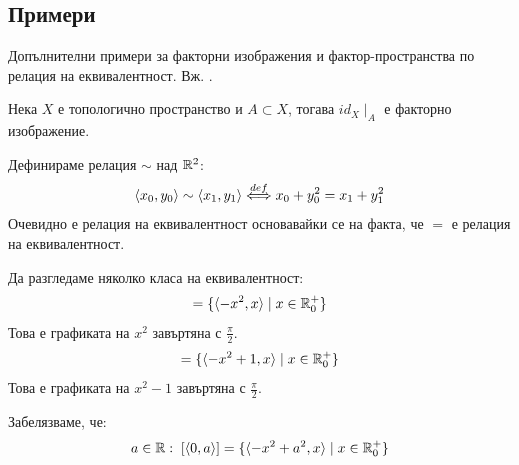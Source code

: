 \subsection{Примери}
Допълнителни примери за факторни изображения и фактор-пространства по релация на еквивалентност. Вж. \cite[стр.~144-145]{munkrestopology}.
\begin{example}
    Нека $X$ е топологично пространство и $A \subset X$, тогава $id_X\mid_A$ е факторно изображение.
\end{example}
\begin{example}
    Дефинираме релация $\sim$ над ${\mathbb{R}}^2$:
    \begin{equation}
        \langle x_0, y_0 \rangle \sim \langle x_1, y_1 \rangle {\overset{def}{\iff}} x_0 + y_0^2 = x_1 + y_1 ^2
    \end{equation}
    Очевидно е релация на еквивалентност основавайки се на факта, че $=$ е релация на еквивалентност.

    Да разгледаме няколко класа на еквивалентност:
    \begin{equation}
        [\langle 0, 0 \rangle] = \{ \langle -x^2, x \rangle \mid x \in \R_0^+\}
    \end{equation}
    Това е графиката на $x^2$ завъртяна с $\frac{\pi}{2}$.
    \begin{equation}
        [\langle 0, 1 \rangle] = \{ \langle -x^2 + 1, x \rangle \mid x \in \R_0^+\}
    \end{equation}
    Това е графиката на $x^2 - 1$ завъртяна с $\frac{\pi}{2}$.

    Забелязваме, че:
    \begin{equation}
        a\in {\mathbb{R}}:\; [\langle 0, a \rangle] = \{ \langle -x^2 + a^2, x \rangle \mid x \in {\mathbb{R}}_0^+\}
    \end{equation}


\end{example}
